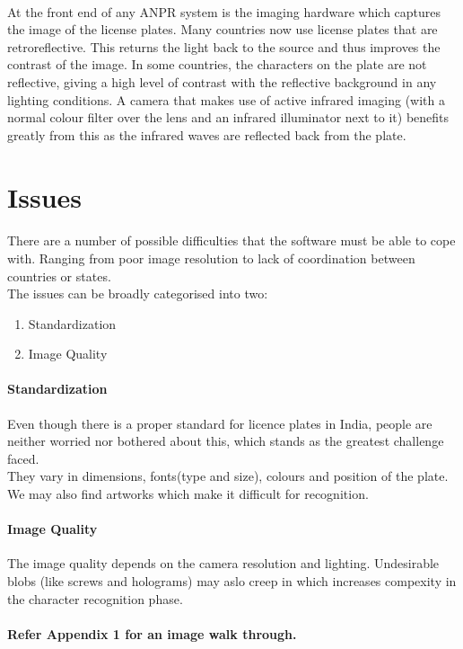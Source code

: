 \documentclass[a4paper,10pt]{iesreport}
\begin{document}
\paragraph*{}
At the front end of any ANPR system is the imaging hardware which captures the image of the license plates. 
Many countries now use license plates that are retroreflective. This returns the light back to the source and thus improves the contrast of the image. In some countries, the characters on the plate are not reflective, giving a high level of contrast with the reflective background in any lighting conditions. A camera that makes use of active infrared imaging (with a normal colour filter over the lens and an infrared illuminator next to it) benefits greatly from this as the infrared waves are reflected back from the plate. 
\newpage
\section{Issues}
\paragraph*{}
There are a number of possible difficulties that the software must be able to cope with. Ranging from poor image resolution to lack of coordination between countries or states.
\\
The issues can be broadly categorised into two:
\begin{enumerate}
 \item Standardization
 \item Image Quality
\end{enumerate}

\paragraph*{Standardization}
Even though there is a proper standard for licence plates in India, people are neither worried nor bothered about this, which stands as the greatest challenge faced. \\
They vary in dimensions, fonts(type and size), colours and position of the plate. We may also find artworks which make it difficult for recognition. 
\\
\paragraph*{Image Quality}
The image quality depends on the camera resolution and lighting. Undesirable blobs (like screws and holograms) may aslo creep in which increases compexity in the character recognition phase. 
\\ \\
\textbf{Refer Appendix 1 for an image walk through.}
\end{document}

